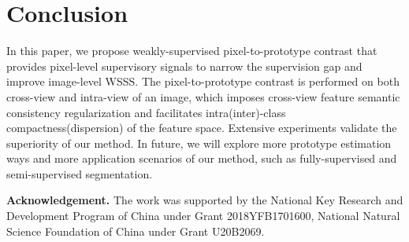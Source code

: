 \documentclass[10pt,twocolumn,letterpaper]{article}
\begin{document}
\section{Conclusion}
In this paper, we propose weakly-supervised pixel-to-prototype contrast that provides pixel-level supervisory signals to narrow the supervision gap and improve image-level WSSS. 
The pixel-to-prototype contrast is performed on both cross-view and intra-view of an image, which imposes cross-view feature semantic consistency regularization and facilitates intra(inter)-class compactness(dispersion) of the feature space.
Extensive experiments validate the superiority of our method.
In future, we will explore more prototype estimation ways and more application scenarios of our method, such as fully-supervised and semi-supervised segmentation.

\textbf{Acknowledgement.} The work was supported by the National Key Research and Development Program of China under Grant 2018YFB1701600, National Natural Science Foundation of China under Grant U20B2069.

{\small


}
\end{document}
